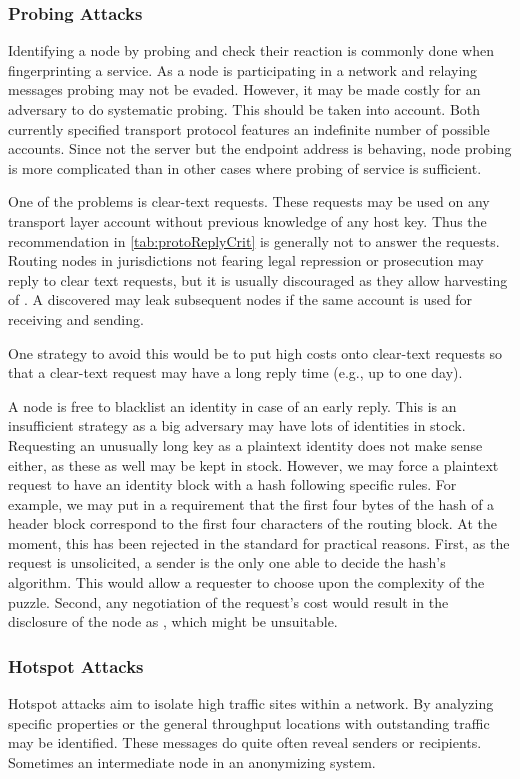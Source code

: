 \subsubsection{Probing Attacks}
Identifying a node by probing and check their reaction is commonly done when fingerprinting a service. As a node is participating in a network and relaying messages probing may not be evaded. However, it may be made costly for an adversary to do systematic probing. This should be taken into account. Both currently specified transport protocol features an indefinite number of possible accounts. Since not the server but the endpoint address is behaving, node probing is more complicated than in other cases where probing of service is sufficient. 

One of the problems is clear-text requests. These requests may be used on any transport layer account without previous knowledge of any host key. Thus the recommendation in \cref{tab:protoReplyCrit} is generally not to answer the requests. Routing nodes in jurisdictions not fearing legal repression or prosecution may reply to clear text requests, but it is usually discouraged as they allow harvesting of \VortexNodes{}. A discovered \VortexNode{} may leak subsequent nodes if the same account is used for receiving and sending.

One strategy to avoid this would be to put high costs onto clear-text requests so that a clear-text request may have a long reply time (e.g., up to one day). 

A node is free to blacklist an identity in case of an early reply. This is an insufficient strategy as a big adversary may have lots of identities in stock. Requesting an unusually long key as a plaintext identity does not make sense either, as these as well may be kept in stock. However, we may force a plaintext request to have an identity block with a hash following specific rules. For example, we may put in a requirement that the first four bytes of the hash of a header block correspond to the first four characters of the routing block. At the moment, this has been rejected in the standard for practical reasons. First, as the request is unsolicited, a sender is the only one able to decide the hash's algorithm. This would allow a requester to choose upon the complexity of the puzzle. Second, any negotiation of the request's cost would result in the disclosure of the node as \VortexNode, which might be unsuitable.

\subsubsection{Hotspot Attacks}
Hotspot attacks aim to isolate high traffic sites within a network. By analyzing specific properties or the general throughput locations with outstanding traffic may be identified. These messages do quite often reveal senders or recipients. Sometimes an intermediate node in an anonymizing system. 

